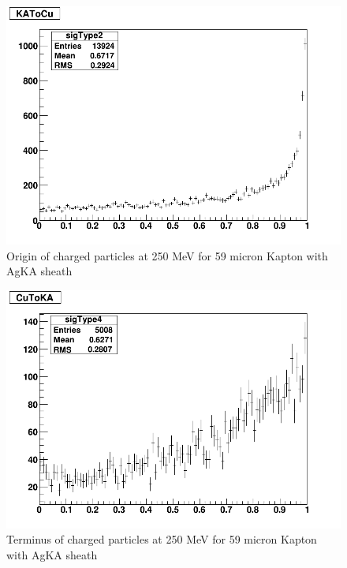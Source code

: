 \documentclass{article}
\begin{document}
\begin{figure}[H]
\centering
\includegraphics[width=6in]{figures/Cu_KA_AgKA/S59/KAtoCu.png}
\caption{Origin of charged particles at 250 MeV for 59 micron Kapton with AgKA sheath}
\label{fig:G4_stats_AgKA_b}
\end{figure}

\begin{figure}[H]
\centering
\includegraphics[width=6in]{figures/Cu_KA_AgKA/S59/CutoKA.png}
\caption{Terminus of charged particles at 250 MeV for 59 micron Kapton with AgKA sheath}
\label{fig:G4_stats_AgKA_c}
\end{figure}
\end{document}
